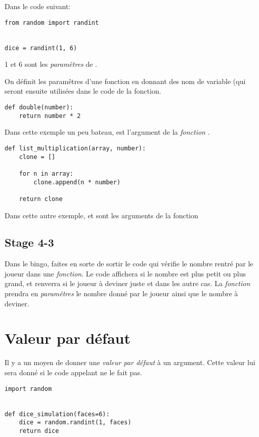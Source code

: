 Dans le code suivant:

\begin{lstlisting}
from random import randint


dice = randint(1, 6)
\end{lstlisting}

1 et 6 sont les \emph{paramêtres} de .

On définit les paramêtres d'une fonction en donnant des nom de variable (qui seront ensuite utilisées dans le code de la fonction.

\begin{lstlisting}
def double(number):
	return number * 2
\end{lstlisting}

Dans cette exemple un peu bateau,  est l'argument de la \emph{fonction} .

\begin{lstlisting}
def list_multiplication(array, number):
	clone = []
	
	for n in array:
		clone.append(n * number)

	return clone
\end{lstlisting}

Dans cette autre exemple,  et  sont les arguments de la fonction 

\subsection{Stage 4-3}

Dans le bingo, faites en sorte de sortir le code qui vérifie le nombre rentré par le joueur dans une \emph{fonction}.
Le code affichera si le nombre est plus petit ou plus grand, et renverra  si le joueur à deviner juste et  dans les autre cas.
La \emph{fonction} prendra en \emph{paramêtres} le nombre donné par le joueur ainsi que le nombre à deviner.

\section{Valeur par défaut}

Il y a un moyen de donner une \emph{valeur par défaut} à un argument.
Cette valeur lui sera donné si le code appelant ne le fait pas.

\begin{lstlisting}
import random


def dice_simulation(faces=6):
	dice = random.randint(1, faces)
	return dice
\end{lstlisting}

